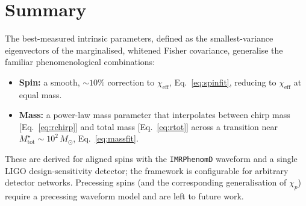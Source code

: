 \documentclass[11pt]{article}
\newcommand{\chieff}{\chi_{\mathrm{eff}}}
\newcommand{\Mtot}{M_{\mathrm{tot}}}
\begin{document}
\section{Summary}

The best-measured intrinsic parameters, defined as the smallest-variance
eigenvectors of the marginalised, whitened Fisher covariance, generalise the
familiar phenomenological combinations:
\begin{itemize}
  \item \textbf{Spin:} a smooth, $\sim10\%$ correction to $\chieff$,
  Eq.~\eqref{eq:spinfit}, reducing to $\chieff$ at equal mass.
  \item \textbf{Mass:} a power-law mass parameter that interpolates between
  chirp mass [Eq.~\eqref{eq:rchirp}] and total mass [Eq.~\eqref{eq:rtot}] across
  a transition near $\Mtot^{\star}\sim10^2\,M_\odot$, Eq.~\eqref{eq:massfit}.
\end{itemize}
These are derived for aligned spins with the \texttt{IMRPhenomD} waveform and a
single LIGO design-sensitivity detector; the framework is configurable for
arbitrary detector networks. Precessing spins (and the corresponding
generalisation of $\chi_p$) require a precessing waveform model and are left to
future work.
\end{document}
